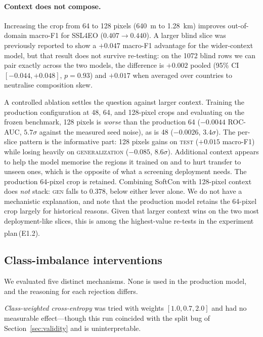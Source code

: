 \documentclass[11pt,a4paper]{article}
\newcommand{\unablated}[1]{\textsuperscript{\dag}\,(#1)}
\begin{document}
\paragraph{Context does not compose.}
Increasing the crop from 64 to 128 pixels (\SI{640}{\metre} to
\SI{1.28}{\kilo\metre}) improves out-of-domain macro-F1 for SSL4EO
($0.407 \rightarrow 0.440$). A larger blind slice was previously reported to show
a $+0.047$ macro-F1 advantage for the wider-context model, but that result does
not survive re-testing: on the \num{1072} blind rows we can pair exactly across
the two models, the difference is $+0.002$ pooled (95\% CI $[-0.044, +0.048]$,
$p = 0.93$) and $+0.017$ when averaged over countries to neutralise composition
skew.

A controlled ablation settles the question against larger context. Training the
production configuration at 48, 64, and 128-pixel crops and evaluating on the
frozen benchmark, 128 pixels is \emph{worse} than the production 64
($-0.0044$ ROC-AUC, $5.7\sigma$ against the measured seed noise), as is 48
($-0.0026$, $3.4\sigma$). The per-slice pattern is the informative part: 128
pixels gains on \textsc{test} ($+0.015$ macro-F1) while losing heavily on
\textsc{generalization} ($-0.085$, $8.6\sigma$). Additional context appears to
help the model memorise the regions it trained on and to hurt transfer to unseen
ones, which is the opposite of what a screening deployment needs. The production
64-pixel crop is retained. Combining SoftCon with 128-pixel
context does \emph{not} stack: \textsc{gen} falls to $0.378$, below either lever
alone. We do not have a mechanistic explanation, and note that the production
model retains the 64-pixel crop largely for historical reasons. Given that
larger context wins on the two most deployment-like slices, this is among the
highest-value re-tests in the experiment plan\unablated{E1.2}.

\subsection{Class-imbalance interventions}
\label{sec:imbalance}

We evaluated five distinct mechanisms. None is used in the production model, and
the reasoning for each rejection differs.

\emph{Class-weighted cross-entropy} was tried with weights $[1.0, 0.7, 2.0]$ and
had no measurable effect---though this run coincided with the split bug of
Section~\ref{sec:validity} and is uninterpretable.
\end{document}
